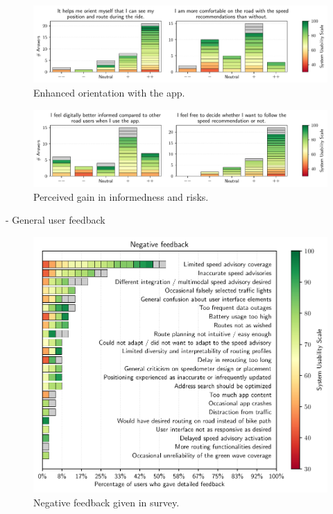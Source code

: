 \begin{figure}[t]
\caption{Enhanced orientation with the app.}\label{fig:app-enhanced-orientation}
\includegraphics[width=\linewidth]{images/app-usability-questions-app-enhanced-orientation.pdf}
\end{figure}
          

\begin{figure}[t]
\caption{Perceived gain in informedness and risks.}\label{fig:app-informedness-freedom}
\includegraphics[width=\linewidth]{images/app-usability-questions-app-informedness-freedom.pdf}
\end{figure}

- General user feedback

\begin{figure}[t]
\caption{Negative feedback given in survey.}\label{fig:app-negative-feedback}
\includegraphics[width=\linewidth]{images/app-feedback-negative.pdf}
\end{figure}

